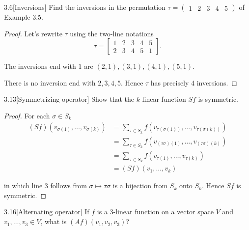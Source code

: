 \begin{exercise}{3.6}[Inversions]
    Find the inversions in the permutation \( \tau = \begin{pmatrix}1 & 2 & 3 & 4 & 5\end{pmatrix} \) of Example 3.5.
\end{exercise}

\begin{proof}
    Let's rewrite \( \tau \) using the two-line notations
    \[
        \tau = \begin{bmatrix}
            1 & 2 & 3 & 4 & 5 \\
            2 & 3 & 4 & 5 & 1
        \end{bmatrix}.
    \]

    The inversions end with \( 1 \) are \( (2,1), (3,1), (4,1), (5,1) \).

    There is no inversion end with \( 2, 3, 4, 5 \). Hence \( \tau \) has precisely 4 inversions.
\end{proof}

\begin{exercise}{3.13}[Symmetrizing operator]
    Show that the \( k \)-linear function \( Sf \) is symmetric.
\end{exercise}

\begin{proof}
    For each \( \sigma \in S_{k} \)
    \begingroup
    \allowdisplaybreaks%
    \begin{align*}
        (Sf)(v_{\sigma(1)}, \ldots, v_{\sigma(k)}) & = \sum_{\tau \in S_{k}} f(v_{\tau(\sigma(1))}, \ldots, v_{\tau(\sigma(k))}) \\
                                                   & = \sum_{\tau \in S_{k}} f(v_{(\tau\sigma)(1)}, \ldots, v_{(\tau\sigma)(k)}) \\
                                                   & = \sum_{\tau \in S_{k}} f(v_{\tau(1)}, \ldots, v_{\tau(k)})                 \\
                                                   & = (Sf)(v_{1}, \ldots, v_{k})
    \end{align*}
    \endgroup

    in which line 3 follows from \( \sigma \mapsto \tau\sigma \) is a bijection from \( S_{k} \) onto \( S_{k} \). Hence \( Sf \) is symmetric.
\end{proof}

\begin{exercise}{3.16}[Alternating operator]
    If \( f \) is a 3-linear function on a vector space \( V \) and \( v_{1}, \ldots, v_{3} \in V \), what is \( (Af)(v_{1}, v_{2}, v_{3}) \)?
\end{exercise}

